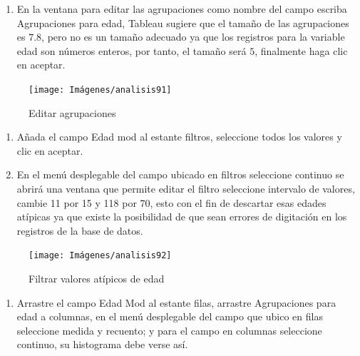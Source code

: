 \documentclass[
]{book}
\providecommand{\tightlist}{%
  \setlength{\itemsep}{0pt}\setlength{\parskip}{0pt}}
\begin{document}
\begin{enumerate}
\def\labelenumi{\arabic{enumi}.}
\setcounter{enumi}{2}
\tightlist
\item
  En la ventana para editar las agrupaciones como nombre del campo escriba Agrupaciones para edad, Tableau sugiere que el tamaño de las agrupaciones es \(7.8\), pero no es un tamaño adecuado ya que los registros para la variable edad son números enteros, por tanto, el tamaño será \(5\), finalmente haga clic en aceptar.
\end{enumerate}

\begin{figure}

{\centering \texttt{[image: Imágenes/analisis91]} 

}

\caption{Editar agrupaciones}\label{fig:paso3histograma-fig}
\end{figure}

\begin{enumerate}
\def\labelenumi{\arabic{enumi}.}
\setcounter{enumi}{3}
\item
  Añada el campo Edad mod al estante filtros, seleccione todos los valores y clic en aceptar.
\item
  En el menú desplegable del campo ubicado en filtros seleccione continuo se abrirá una ventana que permite editar el filtro seleccione intervalo de valores, cambie 11 por 15 y 118 por 70, esto con el fin de descartar esas edades atípicas ya que existe la posibilidad de que sean errores de digitación en los registros de la base de datos.
\end{enumerate}

\begin{figure}

{\centering \texttt{[image: Imágenes/analisis92]} 

}

\caption{Filtrar valores atípicos de edad}\label{fig:paso5histograma-fig}
\end{figure}

\begin{enumerate}
\def\labelenumi{\arabic{enumi}.}
\setcounter{enumi}{5}
\tightlist
\item
  Arrastre el campo Edad Mod al estante filas, arrastre Agrupaciones para edad a columnas, en el menú desplegable del campo que ubico en filas seleccione medida y recuento; y para el campo en columnas seleccione continuo, su histograma debe verse así.
\end{enumerate}
\end{document}
